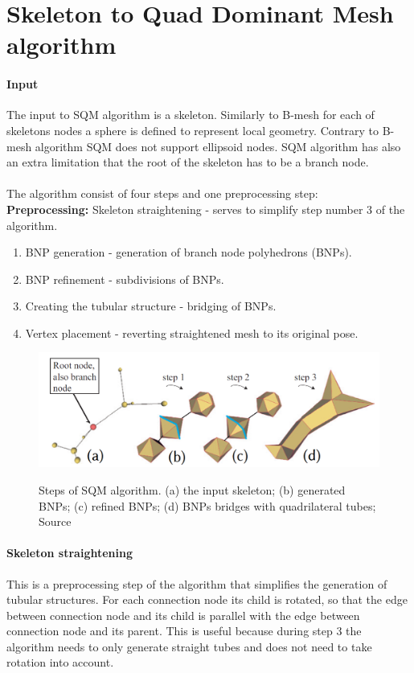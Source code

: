 \section{Skeleton to Quad Dominant Mesh algorithm}
\paragraph{Input}
The input to SQM algorithm is a skeleton. Similarly to B-mesh for each of skeletons nodes a sphere is defined to represent local geometry. Contrary to B-mesh algorithm SQM does not support ellipsoid nodes. SQM algorithm has also an extra limitation that the root of the skeleton has to be a branch node.
\paragraph{}
The algorithm consist of four steps and one preprocessing step:\\
\textbf{Preprocessing:} Skeleton straightening - serves to simplify step number 3 of the algorithm.
\begin{enumerate}
	\itemsep-0.25em 
	\item BNP generation - generation of branch node polyhedrons (BNPs).
	\item BNP refinement - subdivisions of BNPs.
	\item Creating the tubular structure - bridging of BNPs.
	\item Vertex placement - reverting straightened mesh to its original pose.
\end{enumerate}

\begin{figure}[h]
    \centering
    \includegraphics[width=\textwidth]{images/sqm_viz.png}
    \label{fig:sqm_algorithm_steps}
    \caption[Steps of SQM algorithm]{Steps of SQM algorithm. (a) the input skeleton; (b) generated BNPs; (c) refined BNPs; (d) BNPs bridges with quadrilateral tubes; Source \cite{sqm}}
\end{figure}

\paragraph{Skeleton straightening}
This is a preprocessing step of the algorithm that simplifies the generation of tubular structures. For each connection node its child is rotated, so that the edge between connection node and its child is parallel with the edge between connection node and its parent. This is useful because during step 3 the algorithm needs to only generate straight tubes and does not need to take rotation into account.

